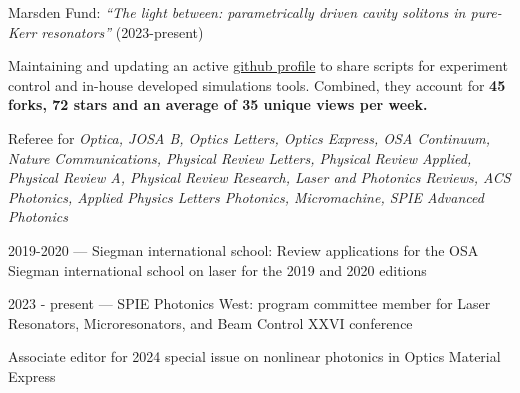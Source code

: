\documentclass[11pt, a4paper]{customcv}
\begin{document}
{{        \vspace{1ex}
        \begin{cvitems} %
            \item Marsden Fund:  \textit{``The light between: parametrically driven cavity solitons in pure-Kerr resonators''} (2023-present)
        \end{cvitems}
    }
    \vspace{0.75ex}
}



%
{
    {
      \begin{cvitems} %
            \item {Maintaining and updating an active \href{https://github.com/gregmoille}{github profile}} to share scripts for experiment control and in-house developed simulations tools. Combined, they account for \textbf{45 forks, 72 stars and an average of 35 unique views per week.}
      \end{cvitems}
    }
    \vspace{1ex}
    {
      \begin{cvitems} %
            \item {Referee for \textit{Optica, JOSA B, Optics Letters, Optics Express, OSA Continuum, Nature Communications, Physical Review Letters, Physical Review Applied, Physical Review A, Physical Review Research, Laser and Photonics Reviews,  ACS Photonics, Applied Physics Letters Photonics, Micromachine, SPIE Advanced Photonics}}
      \end{cvitems}
    }
    \vspace{1ex}
    {
      \begin{cvitems} %
            \item {2019-2020 --- Siegman international school: Review applications for the OSA Siegman international school on laser for the 2019 and 2020 editions}
            \item {2023 - present --- SPIE Photonics West: program committee member for Laser Resonators, Microresonators, and Beam Control XXVI conference}
            \item Associate editor for 2024 special issue on nonlinear photonics in Optics Material Express 
      \end{cvitems}
    }
}
\end{document}
